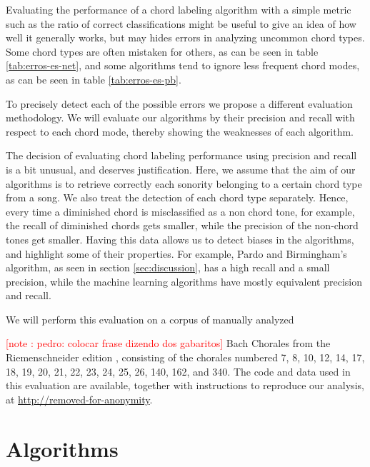 \documentclass{article}
\newcounter{notecounter}
\newcommand{\note}[1]{
  \addtocounter{notecounter}{1}
  \textcolor{red}{[note \arabic{notecounter}: #1]}
}
\begin{document}
Evaluating the performance of a chord labeling algorithm with a simple
metric such as the ratio of correct classifications might be useful to
give an idea of how well it generally works, but may hides errors in
analyzing uncommon chord types. Some chord types are often mistaken
for others, as can be seen in table \ref{tab:erros-es-net}, and some
algorithms tend to ignore less frequent chord modes, as can be seen in
table \ref{tab:erros-es-pb}.

To precisely detect each of the possible errors we propose a different
evaluation methodology. We will evaluate our algorithms by their
precision and recall with respect to each chord mode, thereby showing
the weaknesses of each algorithm.

The decision of evaluating chord labeling performance using precision
and recall is a bit unusual, and deserves justification. Here, we
assume that the aim of our algorithms is to retrieve correctly each
sonority belonging to a certain chord type from a song. We also treat
the detection of each chord type separately. Hence, every time a
diminished chord is misclassified as a non chord tone, for example,
the recall of diminished chords gets smaller, while the precision of
the non-chord tones get smaller. Having this data allows us to detect
biases in the algorithms, and highlight some of their properties. For
example, Pardo and Birmingham's algorithm, as seen in section
\ref{sec:discussion}, has a high recall and a small precision, while
the machine learning algorithms have mostly equivalent precision and
recall.

We will perform this evaluation on a corpus of manually analyzed
\note{pedro: colocar frase dizendo dos gabaritos} Bach Chorales from
the Riemenschneider edition \cite{bach:371}, consisting of the
chorales numbered 7, 8, 10, 12, 14, 17, 18, 19, 20, 21, 22, 23, 24,
25, 26, 140, 162, and 340. The code and data used in this evaluation
are available, together with instructions to reproduce our analysis,
at \url{http://removed-for-anonymity}.

\section{Algorithms}
\label{sec:algorithms}
\end{document}
